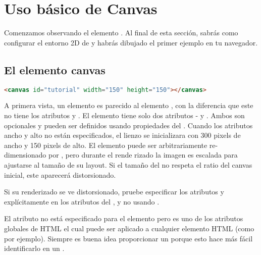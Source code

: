 \section{Uso básico de Canvas}

Comenzamos observando el elemento . Al final de esta sección, sabrás como configurar el entorno 2D de  y habrás dibujado el primer ejemplo en tu navegador.

\subsection{El elemento canvas}

\begin{lstlisting}[language=HTML, style=mystyle2]
  <canvas id="tutorial" width="150" height="150"></canvas>
\end{lstlisting}

A primera vista, un elemento  es parecido al elemento , con la diferencia que este no tiene los atributos  y . El elemento  tiene solo dos atributos -  y . Ambos son opcionales y pueden ser definidos usando propiedades del . Cuando los atributos ancho y alto no están especificados, el lienzo se inicializara con 300 pixels de ancho y 150 pixels de alto. El elemento puede ser arbitrariamente re-dimensionado por , pero durante el rende rizado la imagen es escalada para ajustarse al tamaño de su layout. Si el tamaño del  no respeta el ratio del canvas inicial, este aparecerá distorsionado.

\vspace{0.5cm} %
\begin{tcolorbox}
	[colback=red!5!white,colframe=cyan,fonttitle=\bfseries,title={\faLightbulbO\, Nota:}]
	Si su renderizado se ve distorsionado, pruebe especificar los atributos  y  \\ explícitamente en los atributos del  , y no usando .
\end{tcolorbox}
\vspace{0.5cm} %

El atributo  no está especificado para el elemento  pero es uno de los atributos globales de HTML el cual puede ser aplicado a cualquier elemento HTML (como  por ejemplo). Siempre es buena idea proporcionar un  porque esto hace más fácil identificarlo en un .

